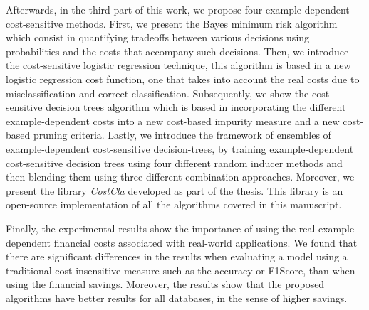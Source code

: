 Afterwards, in the third part of this work, we propose four example-dependent cost-sensitive 
methods. First, we present the Bayes minimum risk algorithm which consist in quantifying tradeoffs 
between various decisions using probabilities and the costs that accompany such decisions. Then, we 
introduce the cost-sensitive logistic regression technique, this algorithm is based in a new 
logistic regression cost function, one that takes into account the real costs due to 
misclassification and correct classification. Subsequently, we show the cost-sensitive decision 
trees algorithm which is based in incorporating the different example-dependent costs into a new 
cost-based impurity measure and a new cost-based pruning criteria. Lastly, we introduce the 
framework of ensembles of example-dependent cost-sensitive decision-trees, by training 
example-dependent cost-sensitive decision trees using four different random inducer methods and then 
blending them using three different combination approaches. Moreover, we present the library 
\mbox{\textit{CostCla}} developed as part of the thesis. This library is an open-source 
implementation of all the algorithms covered in this manuscript.

Finally, the experimental results show the importance of using the real example-dependent financial 
costs associated with real-world applications. We found that there are significant differences 
in the results when evaluating a model using a traditional cost-insensitive measure such as the 
accuracy or F1Score, than when using the financial savings. Moreover, the results show that the 
proposed algorithms have better results for all databases, in the sense of higher savings.